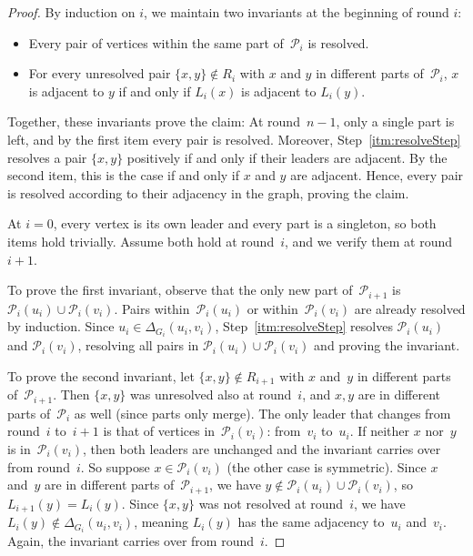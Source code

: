 \documentclass[11pt]{article}
\theoremstyle{definition}
\newcommand{\set}[1]{\{#1\}}
\newcommand{\Pp}{\mathcal{P}}
\begin{document}
\buildsGraph*
\begin{proof}
    By induction on \(i\), we maintain two invariants at the beginning of round \(i\):
    \begin{itemize}
        \item\label{inv:within} Every pair of vertices within the same part of~$\Pp_i$ is resolved.
        \item\label{inv:leader} For every unresolved pair $\set{x,y} \not\in R_i$ with $x$ and $y$ in different parts of~$\Pp_i$, $x$ is adjacent to $y$ if and only if $L_i(x)$ is adjacent to $L_i(y)$.
    \end{itemize}

    Together, these invariants prove the claim:
    At round~$n-1$, only a single part is left, and by the first item every pair is resolved.
    Moreover, Step~\ref{itm:resolveStep} resolves a pair \(\{x,y\}\) positively if and only if their leaders are adjacent.
    By the second item, this is the case if and only if \(x\) and \(y\) are adjacent.
    Hence, every pair is resolved according to their adjacency in the graph, proving the claim.

    At $i=0$, every vertex is its own leader and every part is a singleton, so
    both items hold trivially. Assume both hold at round~$i$, and we verify them at
    round~$i+1$.

    To prove the first invariant, observe that the only new part of~$\Pp_{i+1}$ is $\Pp_i(u_i)\cup\Pp_i(v_i)$.
    Pairs within~$\Pp_i(u_i)$ or within~$\Pp_i(v_i)$ are already resolved by induction.
    Since $u_i\in\Delta_{G_i}(u_i,v_i)$, Step~\ref{itm:resolveStep} resolves \(\Pp_i(u_i)\) and \(\Pp_i(v_i)\),
    resolving all pairs in $\Pp_i(u_i)\cup\Pp_i(v_i)$ and proving the invariant.
    
    To prove the second invariant, let $\set{x,y}\not\in R_{i+1}$ with $x$ and~$y$ in different parts of~$\Pp_{i+1}$.
    Then $\set{x,y}$ was unresolved also at round~$i$, and $x,y$ are in different parts of~$\Pp_i$ as well (since parts only merge).
    The only leader that changes from round~$i$ to~$i{+}1$ is that of vertices in~$\Pp_i(v_i)$: from~$v_i$ to~$u_i$.
    If neither $x$ nor~$y$ is in~$\Pp_i(v_i)$, then both leaders are unchanged and the invariant carries over from round~$i$.
    So suppose $x\in\Pp_i(v_i)$ (the other case is symmetric).
    Since $x$ and~$y$ are in different parts of~$\Pp_{i+1}$, we have $y\notin\Pp_i(u_i)\cup\Pp_i(v_i)$, so $L_{i+1}(y)=L_i(y)$.
    Since $\set{x,y}$ was not resolved at round~$i$, we have $L_i(y)\notin\Delta_{G_i}(u_i,v_i)$, meaning $L_i(y)$ has the same adjacency to~$u_i$ and~$v_i$.
    Again, the invariant carries over from round~$i$.

\end{proof}
\end{document}
